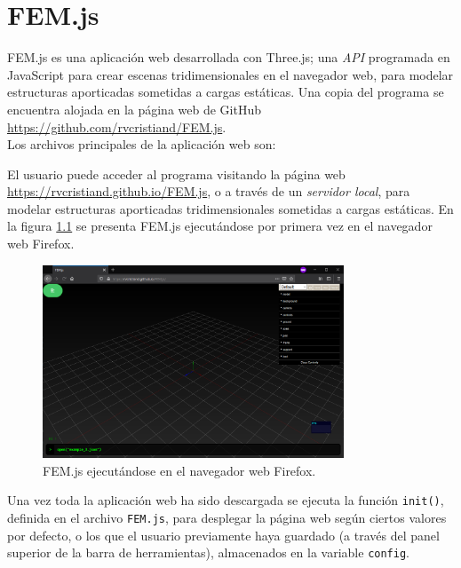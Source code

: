 \chapter{FEM.js}
\label{cha:FEM.js}

FEM.js es una aplicación web desarrollada con Three.js; una \emph{API} programada en JavaScript para crear escenas tridimensionales en el navegador web, para modelar estructuras aporticadas sometidas a cargas estáticas. Una copia del programa se encuentra alojada en la página web de GitHub \url{https://github.com/rvcristiand/FEM.js}.\\

Los archivos principales de la aplicación web son:\\

\bigskip

El usuario puede acceder al programa visitando la página web \url{https://rvcristiand.github.io/FEM.js}, o a través de un \emph{servidor local}, para modelar estructuras aporticadas tridimensionales sometidas a cargas estáticas. En la figura \ref{fig:FEM.js} se presenta FEM.js ejecutándose por primera vez en el navegador web Firefox.\\

\begin{figure}[ht]
    \centering
    \includegraphics[width=0.8\textwidth]{FEM.js/FEM.js.png}
    \caption{FEM.js ejecutándose en el navegador web Firefox.}
    \label{fig:FEM.js}
\end{figure}

Una vez toda la aplicación web ha sido descargada se ejecuta la función \verb|init()|, definida en el archivo \verb|FEM.js|, para desplegar la página web según ciertos valores por defecto, o los que el usuario previamente haya guardado (a través del panel superior de la barra de herramientas), almacenados en la variable \verb|config|.\\

